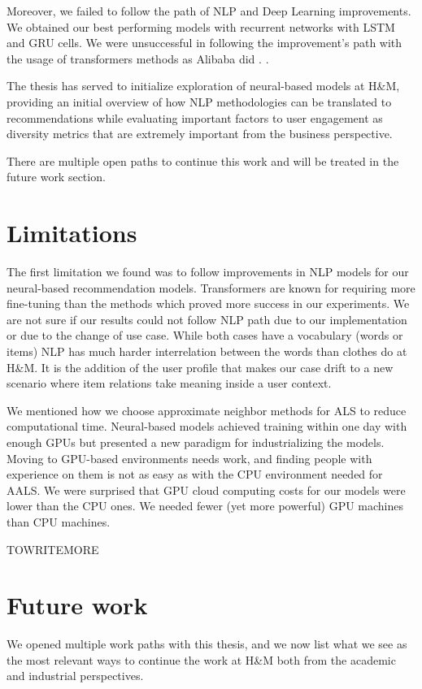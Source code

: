 \documentclass{kththesis}
\begin{document}
Moreover, we failed to follow the path of NLP and Deep Learning improvements. We obtained our best performing models with recurrent networks with LSTM and GRU cells. We were unsuccessful in following the improvement's path with the usage of transformers methods as Alibaba did \cite{alibaba}.  
\cite{sun2019bert4rec}.

The thesis has served to initialize exploration of neural-based models at H\&M, providing an initial overview of how NLP methodologies can be translated to recommendations while evaluating important factors to user engagement as diversity metrics that are extremely important from the business perspective. 

There are multiple open paths to continue this work and will be treated in the future work section.

\section{Limitations}
The first limitation we found was to follow improvements in NLP models for our neural-based recommendation models. Transformers are known for requiring more fine-tuning than the methods which proved more success in our experiments. We are not sure if our results could not follow NLP path due to our implementation or due to the change of use case. While both cases have a vocabulary (words or items) NLP has much harder interrelation between the words than clothes do at H\&M. It is the addition of the user profile that makes our case drift to a new scenario where item relations take meaning inside a user context.

We mentioned how we choose approximate neighbor methods for ALS to reduce computational time. Neural-based models achieved training within one day with enough GPUs but presented a new paradigm for industrializing the models. Moving to GPU-based environments needs work, and finding people with experience on them is not as easy as with the CPU environment needed for AALS. We were surprised that GPU cloud computing costs for our models were lower than the CPU ones. We needed fewer (yet more powerful) GPU machines than CPU machines.

TOWRITEMORE


\section{Future work}
We opened multiple work paths with this thesis, and we now list what we see as the most relevant ways to continue the work at H\&M both from the academic and industrial perspectives.
\end{document}
